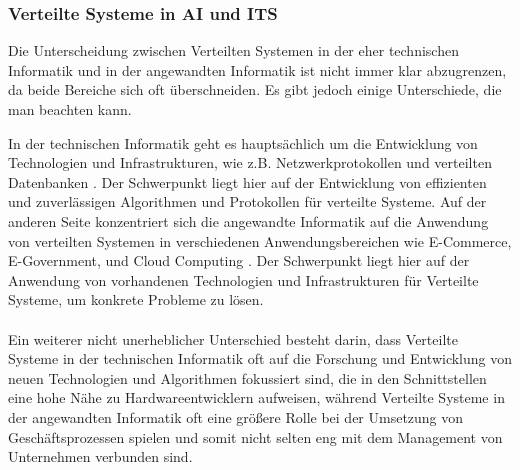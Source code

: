 \subsubsection{Verteilte Systeme in AI und ITS}

Die Unterscheidung zwischen Verteilten Systemen in der eher technischen Informatik und in der angewandten Informatik ist nicht immer klar abzugrenzen, da beide Bereiche sich oft überschneiden. Es gibt jedoch einige Unterschiede, die man beachten kann.

In der technischen Informatik geht es hauptsächlich um die Entwicklung von Technologien und Infrastrukturen, wie z.B. Netzwerkprotokollen und verteilten Datenbanken \cite{coulouris2012distributed}. Der Schwerpunkt liegt hier auf der Entwicklung von effizienten und zuverlässigen Algorithmen und Protokollen für verteilte Systeme. Auf der anderen Seite konzentriert sich die angewandte Informatik auf die Anwendung von verteilten Systemen in verschiedenen Anwendungsbereichen wie E-Commerce, E-Government, und Cloud Computing \cite{ghosh2012distributed}. Der Schwerpunkt liegt hier auf der Anwendung von vorhandenen Technologien und Infrastrukturen für Verteilte Systeme, um konkrete Probleme zu lösen.
\\\\
Ein weiterer nicht unerheblicher Unterschied besteht darin, dass Verteilte Systeme in der technischen Informatik oft auf die Forschung und Entwicklung von neuen Technologien und Algorithmen fokussiert sind, die in den Schnittstellen eine hohe Nähe zu Hardwareentwicklern aufweisen, während Verteilte Systeme in der angewandten Informatik oft eine größere Rolle bei der Umsetzung von Geschäftsprozessen spielen und somit nicht selten eng mit dem Management von Unternehmen verbunden sind\cite{birman2012guide}.


